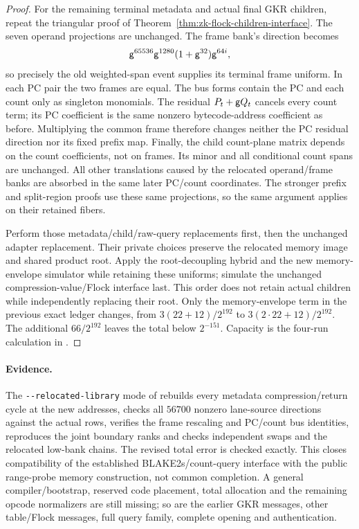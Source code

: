 \begin{proof}
For the remaining terminal metadata and actual final GKR children, repeat the triangular proof of Theorem~\ref{thm:zk-flock-children-interface}. The seven operand projections are unchanged. The frame bank's direction becomes
\[
 \mathsf{g}^{65536}\mathsf{g}^{1280}(1+\mathsf{g}^{32})\mathsf{g}^{64i},
\]
so precisely the old weighted-span event supplies its terminal frame uniform. In each PC pair the two frames are equal. The bus forms contain the PC and each count only as singleton monomials. The residual $P_t+\mathsf{g} Q_t$ cancels every count term; its PC coefficient is the same nonzero bytecode-address coefficient as before. Multiplying the common frame therefore changes neither the PC residual direction nor its fixed prefix map. Finally, the child count-plane matrix depends on the count coefficients, not on frames. Its minor and all conditional count spans are unchanged. All other translations caused by the relocated operand/frame banks are absorbed in the same later PC/count coordinates. The stronger prefix and split-region proofs use these same projections, so the same argument applies on their retained fibers.

Perform those metadata/child/raw-query replacements first, then the unchanged adapter replacement. Their private choices preserve the relocated memory image and shared product root. Apply the root-decoupling hybrid and the new memory-envelope simulator while retaining these uniforms; simulate the unchanged compression-value/Flock interface last. This order does not retain actual children while independently replacing their root. Only the memory-envelope term in the previous exact ledger changes, from $3(22+12)/2^{192}$ to $3(2\cdot22+12)/2^{192}$. The additional $66/2^{192}$ leaves the total below $2^{-151}$. Capacity is the four-run calculation in .
\end{proof}

\paragraph{Evidence.} The \nolinkurl{--relocated-library} mode of  rebuilds every metadata compression/return cycle at the new addresses, checks all $56700$ nonzero lane-source directions against the actual rows, verifies the frame rescaling and PC/count bus identities, reproduces the joint boundary ranks and checks independent swaps and the relocated low-bank chains. The revised total error is checked exactly. This closes compatibility of the established BLAKE2s/count-query interface with the public range-probe memory construction, not common completion. A general compiler/bootstrap, reserved code placement, total allocation and the remaining opcode normalizers are still missing; so are the earlier GKR messages, other table/Flock messages, full query family, complete opening and authentication.

